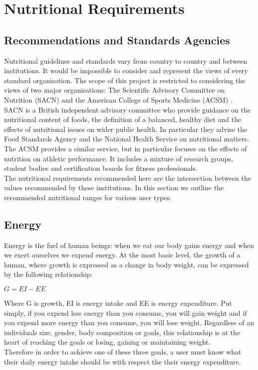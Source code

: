 \documentclass{article}
\begin{document}
\section{Nutritional Requirements}
\subsection{Recommendations and Standards Agencies}
Nutritional guidelines and standards vary from country to country and between institutions. It would be impossible to consider and represent the views of every standard organisation. The scope of this project is restricted to considering the views of two major organisations: The Scientific Advisory Committee on Nutrition (SACN) \cite{SACNHome} and the American College of Sports Medicine (ACSM) \cite{ACSMHome}. \\

SACN is a British independent advisory committee who provide guidance on the nutritional content of foods, the definition of a balanced, healthy diet and the effects of nutritional issues on wider public health. In particular they advise the Food Standards Agency and the National Health Service on nutritional matters.\\

The ACSM provides a similar service, but in particular focuses on the effects of nutrition on athletic performance. It includes a mixture of research groups, student bodies and certification boards for fitness professionals.\\

The nutritional requirements recommended here are the intersection between the values recommended by these institutions. In this section we outline the recommended nutritional ranges for various user types. 
\subsection{Energy}
Energy is the fuel of human beings: when we eat our body gains energy and when we exert ourselves we expend energy. At the most basic level, the growth of a human, where growth is expressed as a change in body weight, can be expressed by the following relationship:\\
\begin{center}
	$G = EI - EE$
\end{center}
Where G is growth, EI is energy intake and EE is energy expenditure. Put simply, if you expend less energy than you consume, you will gain weight and if you expend more energy than you consume, you will lose weight. Regardless of an individuals size, gender, body composition or goals, this relationship is at the heart of reaching the goals or losing, gaining or maintaining weight.\\
Therefore in order to achieve one of these three goals, a user must know what their daily energy intake should be with respect the their energy expenditure.\\
\end{document}
